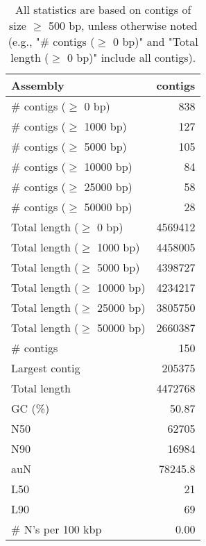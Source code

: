 \documentclass[12pt,a4paper]{article}
\begin{document}
\begin{table}[ht]
\begin{center}
\caption{All statistics are based on contigs of size $\geq$ 500 bp, unless otherwise noted (e.g., "\# contigs ($\geq$ 0 bp)" and "Total length ($\geq$ 0 bp)" include all contigs).}
\begin{tabular}{|l*{1}{|r}|}
\hline
Assembly & contigs \\ \hline
\# contigs ($\geq$ 0 bp) & 838 \\ \hline
\# contigs ($\geq$ 1000 bp) & 127 \\ \hline
\# contigs ($\geq$ 5000 bp) & 105 \\ \hline
\# contigs ($\geq$ 10000 bp) & 84 \\ \hline
\# contigs ($\geq$ 25000 bp) & 58 \\ \hline
\# contigs ($\geq$ 50000 bp) & 28 \\ \hline
Total length ($\geq$ 0 bp) & 4569412 \\ \hline
Total length ($\geq$ 1000 bp) & 4458005 \\ \hline
Total length ($\geq$ 5000 bp) & 4398727 \\ \hline
Total length ($\geq$ 10000 bp) & 4234217 \\ \hline
Total length ($\geq$ 25000 bp) & 3805750 \\ \hline
Total length ($\geq$ 50000 bp) & 2660387 \\ \hline
\# contigs & 150 \\ \hline
Largest contig & 205375 \\ \hline
Total length & 4472768 \\ \hline
GC (\%) & 50.87 \\ \hline
N50 & 62705 \\ \hline
N90 & 16984 \\ \hline
auN & 78245.8 \\ \hline
L50 & 21 \\ \hline
L90 & 69 \\ \hline
\# N's per 100 kbp & 0.00 \\ \hline
\end{tabular}
\end{center}
\end{table}
\end{document}
